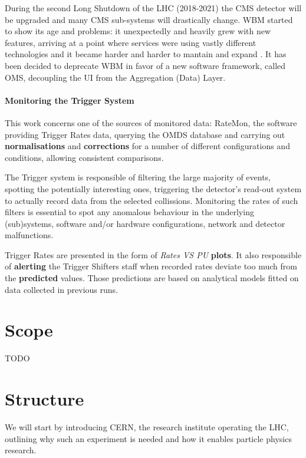 During the second Long Shutdown of the LHC (2018-2021) the CMS detector will be upgraded and many CMS sub-systems will drastically change. WBM started to show its age and problems: it unexpectedly and heavily grew with new features, arriving at a point where services were using vastly different technologies and it became harder and harder to mantain and expand \cite{CMSWBMreview}. It has been decided to deprecate \cite{upgradewbmoms} WBM in favor of a new software framework, called OMS, decoupling the UI from the Aggregation (Data) Layer.

\paragraph{Monitoring the Trigger System}

This work concerns one of the sources of monitored data: RateMon, the software providing Trigger Rates data, querying the OMDS database and carrying out \textbf{normalisations} and \textbf{corrections} for a number of different configurations and conditions, allowing consistent comparisons.

The Trigger system is responsible of filtering the large majority of events, spotting the potentially interesting ones, triggering the detector's read-out system to actually record data from the selected collissions. Monitoring the rates of such filters is essential to spot any anomalous behaviour in the underlying (sub)systems, software and/or hardware configurations, network and detector malfunctions.

Trigger Rates are presented in the form of \textit{Rates VS PU} \textbf{plots}. It also responsible of \textbf{alerting} the Trigger Shifters staff when recorded rates deviate too much from the \textbf{predicted} values. Those predictions are based on analytical models fitted on data collected in previous runs.

\section{Scope}

TODO

\section{Structure}

We will start by introducing CERN, the research institute operating the LHC, outlining why such an experiment is needed and how it enables particle physics research.

